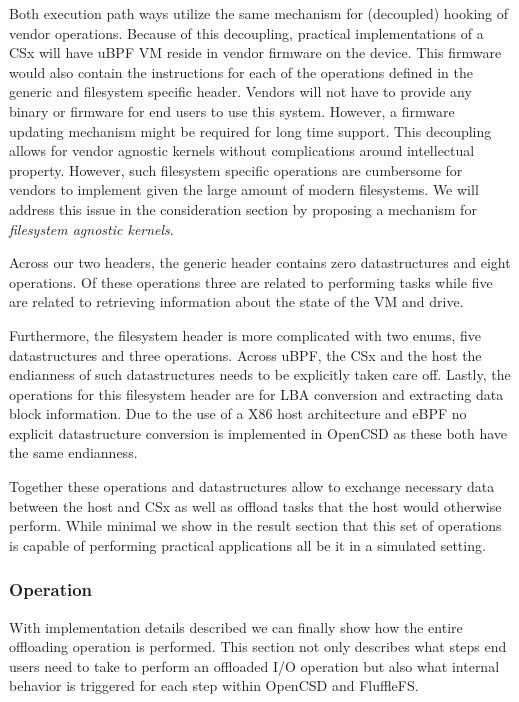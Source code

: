 Both execution path ways utilize the same mechanism for (decoupled) hooking 
of vendor operations. Because of this decoupling, practical implementations of a
CSx will have uBPF VM reside in vendor firmware on the device. This firmware
would also contain the instructions for each of the operations defined in the
generic and filesystem specific header. Vendors will not have to provide any
binary or firmware for end users to use this system. However, a firmware
updating mechanism might be required for long time support. This decoupling
allows for vendor agnostic kernels without complications around intellectual
property. However, such filesystem specific operations are cumbersome for
vendors to implement given the large amount of modern filesystems. We will
address this issue in the consideration section by proposing a mechanism for
\textit{filesystem agnostic kernels}.

Across our two headers, the generic header contains zero datastructures and
eight operations. Of these operations three are related to performing tasks
while five are related to retrieving information about the state of the VM and
drive.

Furthermore, the filesystem header is more complicated with two enums, five
datastructures and three operations. Across uBPF, the CSx and the host the
endianness of such datastructures needs to be explicitly taken care off. Lastly,
the operations for this filesystem header are for LBA conversion and extracting
data block information. Due to the use of a X86 host architecture and eBPF no
explicit datastructure conversion is implemented in OpenCSD as these both have
the same endianness.

Together these operations and datastructures allow to exchange necessary data
between the host and CSx as well as offload tasks that the host would
otherwise perform. While minimal we show in the result section that this set of
operations is capable of performing practical applications all be it in a
simulated setting.

\subsubsection{Operation}

With implementation details described we can finally show how the entire
offloading operation is performed. This section not only describes what steps
end users need to take to perform an offloaded I/O operation but also what
internal behavior is triggered for each step within OpenCSD and FluffleFS.

